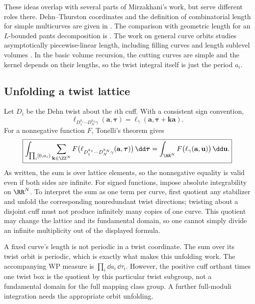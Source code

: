 These ideas overlap with several parts of Mirzakhani's work, but serve
different roles there. Dehn--Thurston coordinates and the definition of
combinatorial length for simple multicurves are given in
\cite[Theorem 3.4 and equation (3.6)]{MirzSimple}. The comparison with
geometric length for an $L$-bounded pants decomposition is
\cite[Proposition 3.5 and equation (3.7), p.~107]{MirzSimple}. The work
on general curve orbits studies asymptotically piecewise-linear length,
including filling curves and length sublevel volumes
\cite[Theorem 4.1 and Section 8]{MirzGeneral}. In the basic volume recursion, the
cutting curves are simple and the kernel depends on their lengths, so the
twist integral itself is just the period $a_i$.

\subsection{Unfolding a twist lattice}

Let $D_i$ be the Dehn twist about the $i$th cuff. With a consistent sign
convention,
\[
 \ell_{D_1^{k_1}\cdots D_N^{k_N}\gamma}(\mathbf a,\boldsymbol\tau)
 =\ell_\gamma(\mathbf a,\boldsymbol\tau+\mathbf k\mathbf a).
\]
For a nonnegative function $F$, Tonelli's theorem gives
\begin{equation}
 \boxed{
 \int_{\prod_i[0,a_i)}\sum_{\mathbf k\in\ZZ^N}
 F\bigl(\ell_{D_1^{k_1}\cdots D_N^{k_N}\gamma}
                  (\mathbf a,\boldsymbol\tau)\bigr)\,\dd\boldsymbol\tau
 =\int_{\RR^N}F\bigl(\ell_\gamma(\mathbf a,\mathbf u)\bigr)\,\dd\mathbf u.}
 \label{eq:twistunfold}
\end{equation}
As written, the sum is over lattice elements, so the nonnegative equality
is valid even if both sides are infinite. For signed functions, impose
absolute integrability on $\RR^N$. To interpret the sum as one term per
curve, first quotient any stabilizer and unfold the corresponding
nonredundant twist directions; twisting about a disjoint cuff must not
produce infinitely many copies of one curve. This quotient may change
the lattice and its fundamental domain, so one cannot simply divide an
infinite multiplicity out of the displayed formula.

A fixed curve's length is not periodic in a twist coordinate. The sum over
its twist orbit is periodic, which is exactly what makes this unfolding
work. The accompanying WP measure is $\prod_i\dd a_i\,\dd\tau_i$.
However, the positive cuff orthant times one twist box is the quotient by
this particular twist subgroup, not a fundamental domain for the full
mapping class group. A further full-moduli integration needs the appropriate
orbit unfolding.

